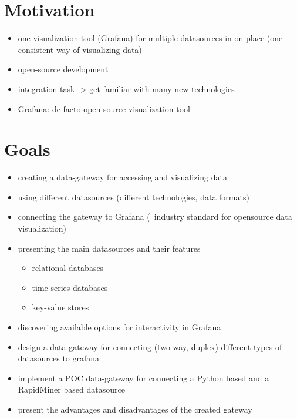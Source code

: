 \section{Motivation}

\begin{itemize}
	\item one visualization tool (Grafana) for multiple datasources in on place (one consistent way of visualizing data)
	\item open-source development
	\item integration task -> get familiar with many new technologies
	\item Grafana: de facto open-source visualization tool
\end{itemize}

\section{Goals}

\begin{itemize}
	\item creating a data-gateway for accessing and visualizing data
	\item using different datasources (different technologies, data formats)
	\item connecting the gateway to Grafana (~industry standard for opensource data visualization)
	\item presenting the main datasources and their features
	\begin{itemize}
		\item relational databases
		\item time-series databases
		\item key-value stores
	\end{itemize}
	\item discovering available options for interactivity in Grafana
	\item design a data-gateway for connecting (two-way, duplex) different types of datasources to grafana
	\item implement a POC data-gateway for connecting a Python based and a RapidMiner based datasource
	\item present the advantages and disadvantages of the created gateway
\end{itemize}


